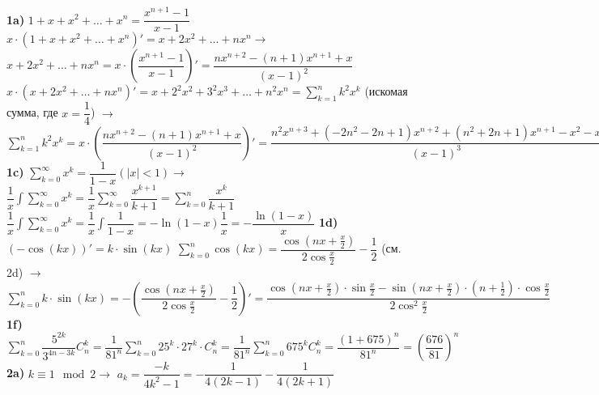 \documentclass[12pt,a4paper,fleqn]{article}
\begin{document}
{\bf 1a)} $1 + x + x^2 + \ldots + x^n = \dfrac{x^{n + 1} - 1}{x - 1}$ \newline
$x \cdot (1 + x + x^2 + \ldots + x^n)' = x + 2x^2 + \ldots + nx^n \rightarrow$ \newline
$x + 2x^2 + \ldots + nx^n = x \cdot \left(\dfrac{x^{n + 1} - 1}{x - 1} \right)' = \dfrac{nx^{n + 2} - (n + 1)x^{n + 1} + x}{(x - 1)^2}$ \newline
$x \cdot (x + 2x^2 + \ldots + nx^n)' = x + 2^2x^2 + 3^2x^3 + \ldots + n^2x^n = \sum_{k = 1}^n k^2x^k$ (искомая сумма, где $x = \dfrac{1}{4}$) $\rightarrow$ \newline
$\sum_{k = 1}^n k^2x^k = x \cdot (\dfrac{nx^{n + 2} - (n + 1)x^{n + 1} + x}{(x - 1)^2})' = \dfrac{n^2x^{n + 3} + (-2n^2 - 2n + 1)x^{n + 2} + (n^2 + 2n + 1)x^{n + 1} - x^2 - x}{(x - 1)^3}$ \newline \newline
{\bf 1c)} $\sum_{k=0}^\infty x^k = \dfrac{1}{1 - x} (|x| < 1) \rightarrow$ \newline
$\dfrac{1}{x} \int \sum_{k=0}^\infty x^k = \dfrac{1}{x} \sum_{k=0}^\infty \dfrac{x^{k + 1}}{k + 1} = \sum_{k = 0}^n \dfrac{x^k}{k + 1}$ \newline
$\dfrac{1}{x} \int \sum_{k=0}^\infty x^k = \dfrac{1}{x} \int \dfrac{1}{1 - x} = -\ln (1 -x) \dfrac{1}{x} = -\dfrac{\ln (1 - x)}{x}$ \newline \newline
{\bf 1d)} $(- \cos (kx))' = k \cdot \sin (kx)$ \newline
$\sum_{k=0}^n \cos (kx) = \dfrac{\cos (nx + \frac{x}{2})}{2\cos\frac{x}{2}} - \dfrac{1}{2}$ (см. 2d) $\rightarrow$ \newline
$\sum_{k=0}^n k \cdot \sin (kx) = - (\dfrac{\cos (nx + \frac{x}{2})}{2\cos\frac{x}{2}} - \dfrac{1}{2})' = \dfrac{\cos (nx + \frac{x}{2}) \cdot \sin \frac{x}{2} - \sin (nx + \frac{x}{2}) \cdot (n + \frac{1}{2}) \cdot \cos \frac{x}{2}}{2 \cos^2 \frac{x}{2}}$ \newline \newline
{\bf 1f)} $\sum_{k=0}^n \dfrac{5^{2k}}{3^{4n-3k}} C_n^k = \dfrac{1}{81^n} \sum_{k=0}^n 25^k \cdot 27^k \cdot C_n^k = \dfrac{1}{81^n} \sum_{k=0}^n 675^k C_n^k = \dfrac{(1 + 675)^n}{81^n} = \left( \dfrac{676}{81} \right) ^n$ \newline \newline
{\bf 2a)} $k \equiv 1\mod 2 \rightarrow$ \newline
$a_k = \dfrac{-k}{4k^2 - 1} = -\dfrac{1}{4(2k - 1)} - \dfrac{1}{4(2k + 1)}$ \newline
\end{document}
